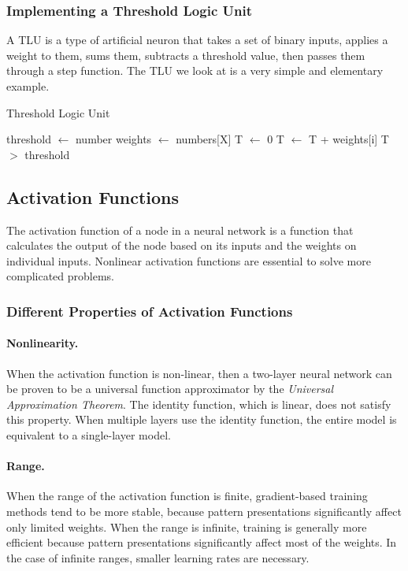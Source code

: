 \documentclass{article}
\begin{document}
\subsubsection{Implementing a Threshold Logic Unit}
A TLU is a type of artificial neuron that takes a set of binary inputs, applies a weight to them, sums them, subtracts 
a threshold value, then passes them through a step function. The TLU we look at is a very simple and elementary example.

\begin{algorithm}
	\caption{Threshold Logic Unit}\label{alg:TLU}
	\begin{algorithmic}[1]
		\State threshold $\gets$ number
		\State weights $\gets$ numbers[X]
		\State T $\gets$ 0
		\State T $\gets$ T + weights[i]
		\EndIf
		\EndFor
		\State \Return T $>$ threshold
		\EndProcedure
	\end{algorithmic}
\end{algorithm}

\pagebreak

\subsection{Activation Functions}
The activation function of a node in a neural network is a function that calculates the output of the node based on 
its inputs and the weights on individual inputs. Nonlinear activation functions are essential to solve more complicated 
problems.
\subsubsection{Different Properties of Activation Functions}
\paragraph{Nonlinearity.} When the activation function is non-linear, then a two-layer neural network can be proven to 
be a universal function approximator by the \textit{Universal Approximation Theorem}. The identity function, which is 
linear, does not satisfy this property. When multiple layers use the identity function, the entire model is equivalent 
to a single-layer model.
\paragraph{Range.} When the range of the activation function is finite, gradient-based training methods tend to be more
stable, because pattern presentations significantly affect only limited weights. When the range is infinite, training is
generally more efficient because pattern presentations significantly affect most of the weights. In the case of infinite 
ranges, smaller learning rates are necessary.
\end{document}
